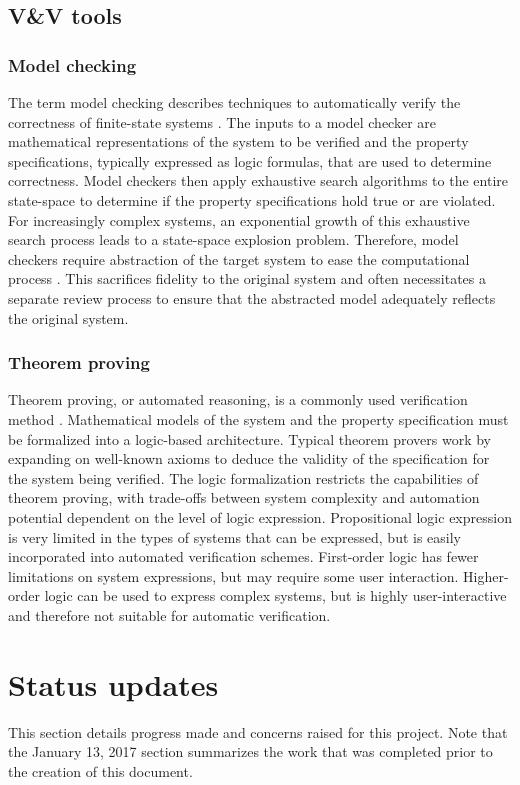 \documentclass[12pt]{article}
\begin{document}
\subsection{V\&V tools}
\subsubsection{Model checking}
The term model checking describes techniques to automatically verify the correctness of finite-state systems \cite{clarke1,grumberg}. The inputs to a model checker are mathematical representations of the system to be verified and the property specifications, typically expressed as logic formulas, that are used to determine correctness. Model checkers then apply exhaustive search algorithms to the entire state-space to determine if the property specifications hold true or are violated. For increasingly complex systems, an exponential growth of this exhaustive search process leads to a state-space explosion problem. Therefore, model checkers require abstraction of the target system to ease the computational process \cite{clarke2,merz}. This sacrifices fidelity to the original system and often necessitates a separate review process to ensure that the abstracted model adequately reflects the original system. 


\subsubsection{Theorem proving}
Theorem proving, or automated reasoning, is a commonly used verification method \cite{hasan,harrison}. Mathematical models of the system and the property specification must be formalized into a logic-based architecture. Typical theorem provers work by expanding on well-known axioms to deduce the validity of the specification for the system being verified. The logic formalization restricts the capabilities of theorem proving, with trade-offs between system complexity and automation potential dependent on the level of logic expression. Propositional logic expression is very limited in the types of systems that can be expressed, but is easily incorporated into automated verification schemes. First-order logic has fewer limitations on system expressions, but may require some user interaction. Higher-order logic can be used to express complex systems, but is highly user-interactive and therefore not suitable for automatic verification.


\section{Status updates}
This section details progress made and concerns raised for this project. Note that the January 13, 2017 section summarizes the work that was completed prior to the creation of this document.
\end{document}
